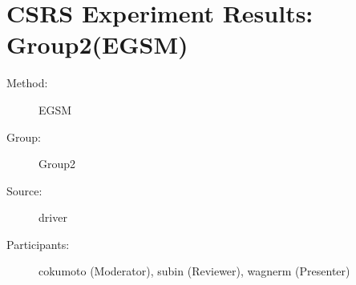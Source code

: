 	  
\chapter {CSRS Experiment Results: Group2(EGSM)}
\small

\begin{description}
\item [Method:] EGSM
\item [Group:] Group2
\item [Source:] driver
\item [Participants:] cokumoto (Moderator), subin (Reviewer), wagnerm (Presenter)
\end{description}
